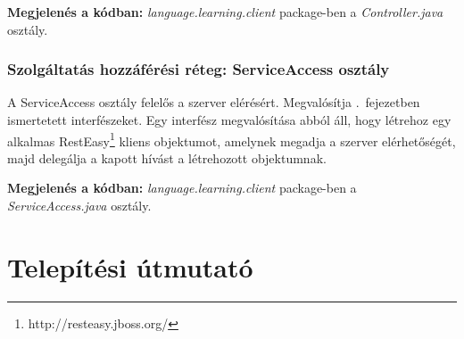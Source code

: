 \documentclass[11pt, a4paper]{article}
\begin{document}
     \textbf{Megjelenés a kódban:} \textit{language.learning.client} package-ben a \textit{Controller.java} osztály.
     
     \subsubsection{Szolgáltatás hozzáférési réteg: ServiceAccess osztály}
     
     A ServiceAccess osztály felelős a szerver elérésért. Megvalósítja .~fejezetben ismertetett interfészeket. Egy interfész megvalósítása abból áll, hogy létrehoz egy alkalmas RestEasy\footnote{http://resteasy.jboss.org/} kliens objektumot, amelynek megadja a szerver elérhetőségét, majd delegálja a kapott hívást a létrehozott objektumnak.
     
     \textbf{Megjelenés a kódban:} \textit{language.learning.client} package-ben a \textit{ServiceAccess.java} osztály.
     
    \section{Telepítési útmutató}
    
    
\end{document}

